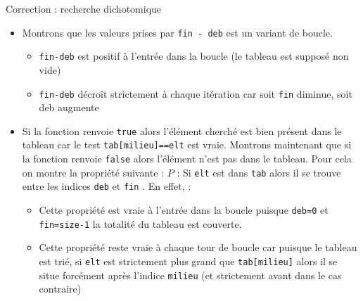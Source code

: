 \documentclass[10pt]{beamer}
\begin{document}
\begin{frame}[fragile]{\Ctitle}{\stitle}
    \begin{exampleblock}{Correction : recherche dichotomique}
        \begin{itemize}
            \item<2->\textcolor{OliveGreen}{Montrons que les valeurs prises par {\tt fin - deb} est un variant de boucle.
            \begin{itemize}
                \item\textcolor{OliveGreen}{{\tt fin-deb} est positif à l'entrée dans la boucle (le tableau est supposé non vide)}
                \item\textcolor{OliveGreen}{{\tt fin-deb} décroît strictement à chaque itération car soit {\tt fin} diminue, soit {\tt }deb augmente}
            \end{itemize}
            }
            \item<3->\textcolor{OliveGreen}{Si la fonction renvoie {\tt true} alors l'élément cherché est bien présent dans le tableau car le test {\tt tab[milieu]==elt} est vraie. Montrons maintenant que si la fonction renvoie {\tt false} alors l'élément n'est pas dans le tableau. Pour cela on montre la propriété suivante : $P$ : \og{} Si {\tt elt} est dans {\tt tab} alors il se trouve entre les indices {\tt deb} et {\tt fin} \fg{}. En effet, :
            \begin{itemize}
                \item<4->\textcolor{OliveGreen}{Cette propriété est vraie à l'entrée dans la boucle puisque {\tt deb=0} et {\tt fin=size-1} la totalité du tableau est couverte.}
                \item<5->\textcolor{OliveGreen}{Cette propriété reste vraie à chaque tour de boucle car puisque le tableau est trié, si {\tt elt} est strictement plus grand que {\tt tab[milieu]} alors il se situe forcément après l'indice {\tt milieu} (et strictement avant dans le cas contraire)}
            \end{itemize}}
        \end{itemize}
    \end{exampleblock}
\end{frame}
\end{document}
